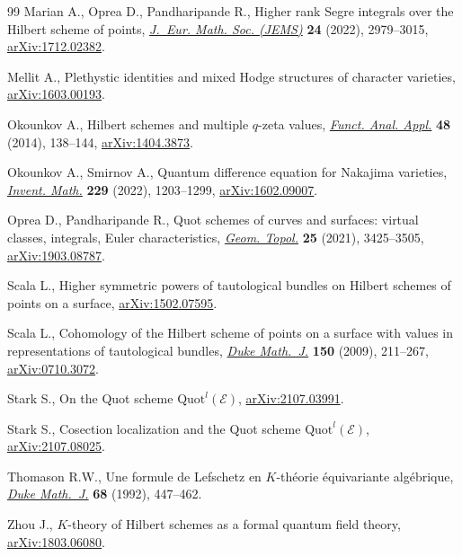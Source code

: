 \documentclass[pdftex]{sigma}
\numberwithin{equation}{section}
\begin{document}
\begin{thebibliography}{99}
Marian A., Oprea D., Pandharipande R., Higher rank {S}egre integrals over the
 {H}ilbert scheme of points, \href{https://doi.org/10.4171/jems/1149}{\textit{J.~Eur. Math. Soc. (JEMS)}} \textbf{24}
 (2022), 2979--3015, \href{https://arxiv.org/abs/1712.02382}{arXiv:1712.02382}.

Mellit A., Plethystic identities and mixed {H}odge structures of character
 varieties, \href{https://arxiv.org/abs/1603.00193}{arXiv:1603.00193}.

Okounkov A., Hilbert schemes and multiple {$q$}-zeta values, \href{https://doi.org/10.1007/s10688-014-0054-z}{\textit{Funct.
 Anal. Appl.}} \textbf{48} (2014), 138--144, \href{https://arxiv.org/abs/1404.3873}{arXiv:1404.3873}.

Okounkov A., Smirnov A., Quantum difference equation for {N}akajima varieties,
 \href{https://doi.org/10.1007/s00222-022-01125-w}{\textit{Invent. Math.}} \textbf{229} (2022), 1203--1299, \href{https://arxiv.org/abs/1602.09007}{arXiv:1602.09007}.

Oprea D., Pandharipande R., Quot schemes of curves and surfaces: virtual
 classes, integrals, {E}uler characteristics, \href{https://doi.org/10.2140/gt.2021.25.3425}{\textit{Geom. Topol.}}
 \textbf{25} (2021), 3425--3505, \href{https://arxiv.org/abs/1903.08787}{arXiv:1903.08787}.

Scala L., Higher symmetric powers of tautological bundles on {H}ilbert schemes
 of points on a surface, \href{https://arxiv.org/abs/1502.07595}{arXiv:1502.07595}.

Scala L., Cohomology of the {H}ilbert scheme of points on a surface with values
 in representations of tautological bundles, \href{https://doi.org/10.1215/00127094-2009-050}{\textit{Duke Math.~J.}}
 \textbf{150} (2009), 211--267, \href{https://arxiv.org/abs/0710.3072}{arXiv:0710.3072}.

Stark S., On the Quot scheme {$\mathrm{Quot}^l(\mathscr{E})$},
 \href{https://arxiv.org/abs/2107.03991}{arXiv:2107.03991}.

Stark S., Cosection localization and the Quot scheme
 $\mathrm{Quot}^{l}(\mathscr{E})$, \href{https://arxiv.org/abs/2107.08025}{arXiv:2107.08025}.

Thomason R.W., Une formule de {L}efschetz en {$K$}-th\'eorie \'equivariante
 alg\'ebrique, \href{https://doi.org/10.1215/S0012-7094-92-06817-7}{\textit{Duke Math.~J.}} \textbf{68} (1992), 447--462.

Zhou J., {$K$}-theory of {H}ilbert schemes as a formal quantum field theory,
 \href{https://arxiv.org/abs/1803.06080}{arXiv:1803.06080}.

\end{thebibliography}\LastPageEnding
\end{document}
